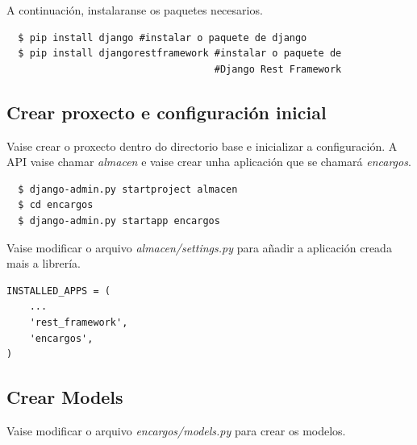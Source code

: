 \documentclass[11pt,twoside]{book}
\begin{document}
A continuación, instalaranse os paquetes necesarios.

\begin{verbatim}
  $ pip install django #instalar o paquete de django
  $ pip install djangorestframework #instalar o paquete de 
                                    #Django Rest Framework
\end{verbatim}

\subsection{Crear proxecto e configuración inicial}

Vaise crear o proxecto dentro do directorio base e inicializar a configuración. A API vaise chamar \textit{almacen} e vaise crear unha aplicación que se chamará \textit{encargos}.

\begin{verbatim}
  $ django-admin.py startproject almacen
  $ cd encargos
  $ django-admin.py startapp encargos
\end{verbatim}

Vaise modificar o arquivo \textit{almacen/settings.py} para añadir a aplicación creada mais a librería.

\begin{verbatim}
INSTALLED_APPS = (
    ...
    'rest_framework',
    'encargos',
)
\end{verbatim}

\subsection{Crear Models}

Vaise modificar o arquivo \textit{encargos/models.py} para crear os modelos.
\end{document}

